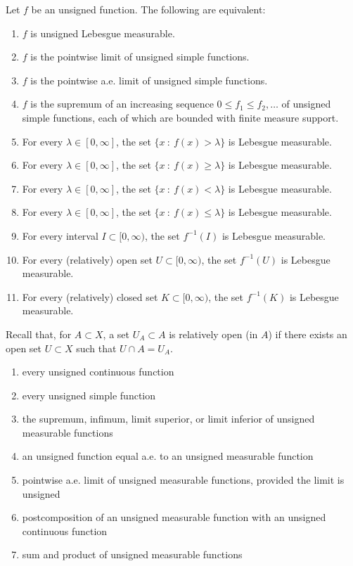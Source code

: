 \documentclass[12pt]{article}
\begin{document}
\begin{definition}
	Let $f$ be an unsigned function. The following are equivalent: \hfill
	\begin{enumerate}
		\item $f$ is unsigned Lebesgue measurable.
		\item $f$ is the pointwise limit of unsigned simple functions. 
		\item $f$ is the pointwise a.e. limit of unsigned simple functions.
		\item $f$ is the supremum of an increasing sequence $0\leq f_1\leq f_2,\dots$ of unsigned simple functions, each of which are bounded with finite measure support.
		\item For every $\lambda\in[0,\infty]$, the set $\{x\ : \ f(x)>\lambda\}$ is Lebesgue measurable.
		\item For every $\lambda\in[0,\infty]$, the set $\{x\ : \ f(x)\geq\lambda\}$ is Lebesgue measurable.
		\item For every $\lambda\in[0,\infty]$, the set $\{x\ : \ f(x)<\lambda\}$ is Lebesgue measurable.
		\item For every $\lambda\in[0,\infty]$, the set $\{x\ : \ f(x)\leq\lambda\}$ is Lebesgue measurable.
		\item For every interval $I\subset[0,\infty)$, the set $f^{-1}(I)$ is Lebesgue measurable.
		\item For every (relatively) open set $U\subset[0,\infty)$, the set $f^{-1}(U)$ is Lebesgue measurable.
		\item For every (relatively) closed set $K\subset[0,\infty)$, the set $f^{-1}(K)$ is Lebesgue measurable.
	\end{enumerate}
\end{definition}

Recall that, for $A\subset X$, a set $U_A\subset A$ is relatively open (in $A$) if there exists an open set $U\subset X$ such that $U\cap A=U_A$. 

\begin{proposition} \hfill
	\begin{enumerate}
		\item every unsigned continuous function
		\item every unsigned simple function 
		\item the supremum, infimum, limit superior, or limit inferior of unsigned measurable functions
		\item an unsigned function equal a.e. to an unsigned measurable function 
		\item pointwise a.e. limit of unsigned measurable functions, provided the limit is unsigned 
		\item postcomposition of an unsigned measurable function with an unsigned continuous function
		\item sum and product of unsigned measurable functions
	\end{enumerate}
\end{proposition}
\end{document}
